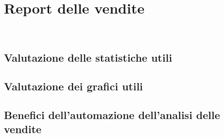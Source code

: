 \chapter{Report delle vendite}
\label{cap:report-vendite}

\\

\section{Valutazione delle statistiche utili}

\section{Valutazione dei grafici utili}

\section{Benefici dell’automazione dell’analisi delle vendite}
